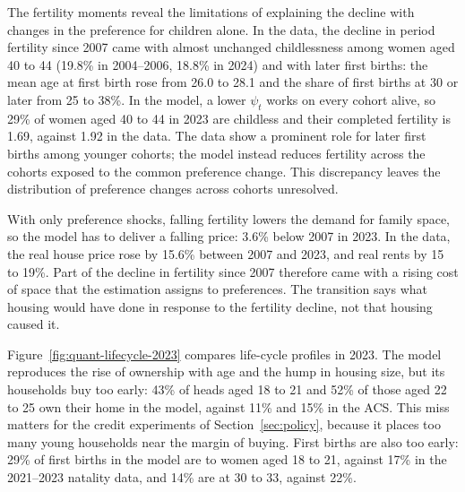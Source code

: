 
The fertility moments reveal the limitations of explaining the decline with
changes in the preference for children alone. In the data, the decline
in period fertility since 2007 came with almost unchanged childlessness among
women aged 40 to 44 (19.8\% in 2004--2006, 18.8\% in 2024) and
with later first births: the mean age at first birth rose from 26.0 to 28.1
and the share of first births at 30 or later from 25 to 38\%. In the
model, a lower $\psi_t$ works on every cohort alive, so 29\% of women
aged 40 to 44 in 2023 are childless and their completed fertility is 1.69,
against 1.92 in the data. The data
show a prominent role for later first births among younger cohorts; the
model instead reduces fertility across the cohorts exposed to the common
preference change. This discrepancy leaves the distribution of preference changes across
cohorts unresolved.

With only preference shocks,
falling fertility lowers the demand for family space, so the model has to
deliver a falling price: 3.6\% below 2007 in 2023. In the data, the real
house price rose by 15.6\% between 2007 and 2023, and real rents by 15
to 19\%. Part of the decline in fertility since 2007 therefore came with
a rising cost of space that the estimation assigns to preferences. The
transition says what housing would have done in response to the fertility
decline, not that housing caused it.

Figure~\ref{fig:quant-lifecycle-2023} compares life-cycle profiles in 2023.
The model reproduces the rise of ownership with age and the hump in housing
size, but its households buy too early: 43\% of heads aged 18
to 21 and 52\% of those aged 22 to 25 own their home in the
model, against 11\% and 15\% in the ACS. This miss matters
for the credit experiments of Section~\ref{sec:policy}, because it places too many young households
near the margin of buying. First births are also too early:
29\% of first births in the model are to women aged 18 to 21,
against 17\% in the 2021--2023 natality data, and 14\% are at
30 to 33, against 22\%.

